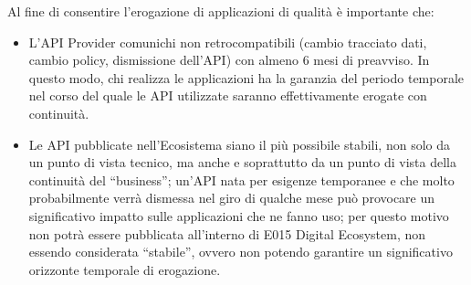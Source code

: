 \documentclass[letterpaper,10pt,italian]{sphinxmanual}
\begin{document}
Al fine di consentire l’erogazione di applicazioni di qualità è importante che:
\begin{itemize}
\item {} 
L’API Provider comunichi  non retrocompatibili (cambio tracciato dati, cambio policy, dismissione dell’API) con almeno 6 mesi di preavviso. In questo modo, chi realizza le applicazioni ha la garanzia del  periodo temporale nel corso del quale le API utilizzate saranno effettivamente erogate con continuità.

\item {} 
Le API pubblicate nell’Ecosistema siano il più possibile stabili, non solo da un punto di vista tecnico, ma anche e soprattutto da un punto di vista della continuità del “business”; un’API nata per esigenze temporanee e che molto probabilmente verrà dismessa nel giro di qualche mese può provocare un significativo impatto sulle applicazioni che ne fanno uso; per questo motivo non potrà essere pubblicata all’interno di E015 Digital Ecosystem, non essendo considerata “stabile”, ovvero non potendo garantire un significativo orizzonte temporale di erogazione.

\end{itemize}
\end{document}
